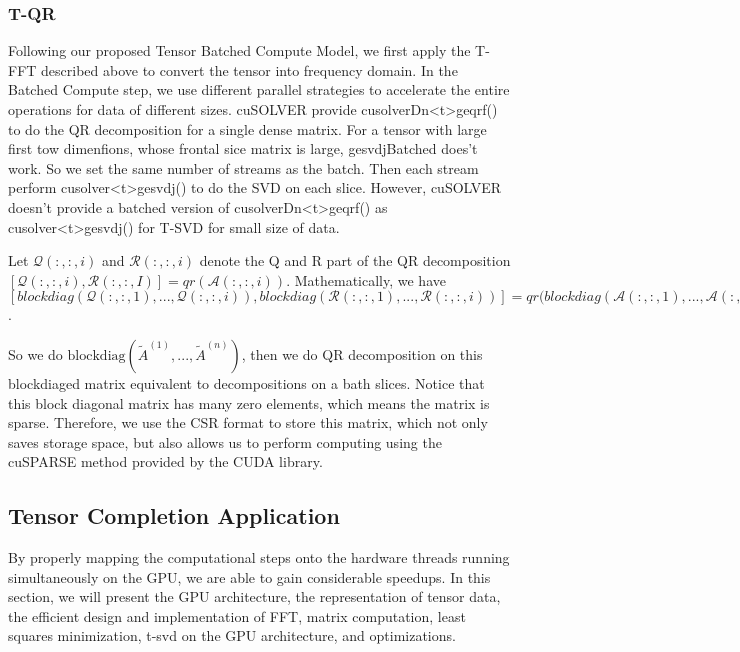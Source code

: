 \documentclass[format=acmsmall, review=false, screen=true]{acmart}
\begin{document}
\subsubsection{T-QR}
Following our proposed Tensor Batched Compute Model, we first apply the T-FFT described above to convert the tensor into frequency domain. In the Batched Compute step, we use different parallel strategies to accelerate the entire operations for data of different sizes. cuSOLVER provide \textup{cusolverDn<t>geqrf()} to do the QR decomposition for a single dense matrix. For a tensor with large first tow dimenfions, whose frontal sice matrix is large, \textup{gesvdjBatched} does't work.  So we set the same number of streams as the batch. Then each stream perform \textup{cusolver<t>gesvdj()} to do the SVD on each slice. However,
cuSOLVER doesn't provide a  batched version of \textup{cusolverDn<t>geqrf()} as  \textup{cusolver<t>gesvdj()} for T-SVD for small size of data.

Let $\mathcal{Q}(:,:,i)$ and $\mathcal{R}(:,:,i)$ denote the Q and R part of the QR decomposition $[\mathcal{Q}(:,:,i) ,\mathcal{R}(:,:,I)] = qr(\mathcal{A}(:,:,i))$. Mathematically, we have   $[blockdiag(\mathcal{Q}(:,:,1),...,\mathcal{Q}(:,:,i)), blockdiag(\mathcal{R}(:,:,1),...,\mathcal{R}(:,:,i))] = qr(blockdiag(\mathcal{A}(:,:,1),...,\mathcal{A}(:,:,i))$. 

So we do $\mathrm{blockdiag}(\widetilde{A}^{(1)},..., \widetilde{A}^{(n)})$, then we do QR decomposition on this blockdiaged matrix equivalent to decompositions on a bath slices. Notice that this block diagonal matrix has many zero elements, which means the matrix is sparse. Therefore, we use the CSR format to store this matrix, which not only saves storage space, but also allows us to perform computing using the cuSPARSE method provided by the CUDA library. 

\subsection{Tensor Completion Application}
By properly mapping the computational steps onto the hardware threads running simultaneously on the GPU, we are able to gain considerable speedups. In this section, we will present the GPU architecture, the representation of tensor data, the efficient design and implementation of FFT, matrix computation, least squares minimization, t-svd on the GPU architecture, and optimizations.
\end{document}
